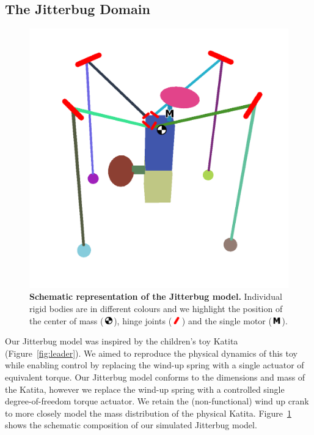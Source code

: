 \documentclass[letterpaper, 10 pt, conference]{ieeeconf}
\newcommand{\com}{\,\includegraphics[width=9pt]{ico-com}\,}
\newcommand{\hinge}{\,\includegraphics[width=9pt]{ico-hinge}\,}
\newcommand{\motor}{\,\includegraphics[width=9pt]{ico-motor}\,}
\begin{document}
\subsection{The Jitterbug Domain}

\begin{figure}[t]
    \centering
    \includegraphics[width=\linewidth]{fig-jitterbug-parts}
    \caption[
        Schematic representation of the Jitterbug model.
        Individual rigid bodies are in different colours and we highlight the position of the center of mass, hinge joints and the single motor.
    ]{
        \textbf{Schematic representation of the Jitterbug model.}
        Individual rigid bodies are in different colours and we highlight the position of the center of mass (\protect\com), hinge joints  (\protect\hinge) and the single motor (\protect\motor).
    }
    \label{fig:parts}
\end{figure}

Our Jitterbug model was inspired by the children's toy Katita (Figure~\ref{fig:leader}).
We aimed to reproduce the physical dynamics of this toy while enabling control by replacing the wind-up spring with a single actuator of equivalent torque.
Our Jitterbug model conforms to the dimensions and mass of the Katita, however we replace the wind-up spring with a controlled single degree-of-freedom torque actuator.
We retain the (non-functional) wind up crank to more closely model the mass distribution of the physical Katita.
Figure~\ref{fig:parts} shows the schematic composition of our simulated Jitterbug model.
\end{document}
